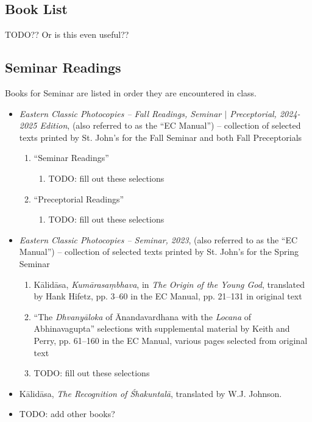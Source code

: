 \documentclass{article}
\begin{document}

\clearpage

\begin{center}
    \section{Book List}
\end{center}

TODO?? Or is this even useful?? 

\subsection{Seminar Readings}
Books for Seminar are listed in order they are encountered in class.

\begin{itemize}
	\item \textit{Eastern Classic Photocopies -- Fall Readings, Seminar $|$ Preceptorial, 2024-2025 Edition}, (also referred to as the ``EC Manual'') -- collection of selected texts printed by St. John's for the Fall Seminar and both Fall Preceptorials
	      \begin{enumerate}
		      \item ``Seminar Readings''
		            \begin{enumerate}
			            \item TODO: fill out these selections
		            \end{enumerate}
		      \item ``Preceptorial Readings''
		            \begin{enumerate}
			            \item TODO: fill out these selections
		            \end{enumerate}
	      \end{enumerate}
	\item \textit{Eastern Classic Photocopies -- Seminar, 2023}, (also referred to as the ``EC Manual'') -- collection of selected texts printed by St. John's for the Spring Seminar
	      \begin{enumerate}
			\item Kālidāsa, \emph{Kumārasaṃbhava}, in \emph{The Origin of the Young God}, translated by Hank Hifetz, pp. 3--60 in the EC Manual, pp. 21--131 in original text
			\item ``The \emph{Dhvanyāloka} of Ānandavardhana with the \emph{Locana} of Abhinavagupta'' selections with supplemental material by Keith and Perry, pp. 61--160 in the EC Manual, various pages selected from original text
		      \item TODO: fill out these selections
	      \end{enumerate}
	\item Kālidāsa, \emph{The Recognition of Śhakuntalā}, translated by W.J. Johnson.
	\item TODO: add other books?
\end{itemize}
\end{document}
